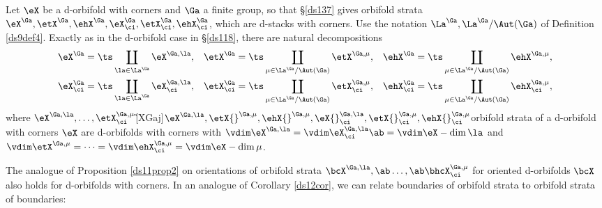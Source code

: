 \documentclass{article}
\begin{document}
Let $\eX$ be a d-orbifold with corners and $\Ga$ a finite group, so
that \S\ref{ds137} gives orbifold strata
$\eX^\Ga,\etX^\Ga,\ehX^\Ga,\eX^\Ga_\ci,\etX^\Ga_\ci,\ehX^\Ga_\ci$,
which are d-stacks with corners. Use the notation
$\La^\Ga,\La^\Ga/\Aut(\Ga)$ of Definition \ref{ds9def4}. Exactly as
in the d-orbifold case in \S\ref{ds118}, there are natural
decompositions
\begin{align*}
\eX^\Ga&=\ts\coprod_{\la\in\La^\Ga}\eX^{\Ga,\la}, &
\etX^\Ga&=\ts\coprod_{\mu\in\La^\Ga/\Aut(\Ga)}\etX^{\Ga,\mu},&
\ehX^\Ga&=\ts\coprod_{\mu\in\La^\Ga/\Aut(\Ga)}\ehX^{\Ga,\mu},\\
\eX^\Ga_\ci&=\ts\coprod_{\smash{\la\in\La^\Ga}}\eX^{\Ga,\la}_\ci, &
\etX^\Ga_\ci&=
\ts\coprod_{\mu\in\La^\Ga/\Aut(\Ga)} \etX^{\Ga,\mu}_\ci, &
\ehX^\Ga_\ci&=\ts\coprod_{\mu\in\La^\Ga/\Aut(\Ga)} \ehX^{\Ga,\mu}_\ci,
\end{align*}
where
$\eX^{\Ga,\la},\ldots,\etX^{\Ga,\mu}_\ci$\G[XGaj]{$\eX^{\Ga,\la},
\etX{}^{\Ga,\mu},\ehX{}^{\Ga,\mu},\eX{}^{\Ga,\la}_\ci,
\etX{}^{\Ga,\mu}_\ci,\ehX{}^{\Ga,\mu}_\ci$}{orbifold strata of a
d-orbifold with corners $\eX$} are d-orbifolds with corners with
$\vdim\eX^{\Ga,\la}=\vdim\eX^{\Ga,\la}_\ci\ab= \vdim\eX-\dim\la$ and
$\vdim\etX^{\Ga,\mu}=\cdots=\vdim\ehX^{\Ga,\mu}_\ci=\vdim\eX-
\dim\mu$.

The analogue of Proposition \ref{ds11prop2} on orientations of
orbifold strata $\bcX^{\Ga,\la},\ab\ldots,\ab\bhcX^{\Ga,\mu}_\ci$
for oriented d-orbifolds $\bcX$ also holds for d-orbifolds with
corners.
In an analogue of Corollary \ref{ds12cor}, we can relate boundaries
of orbifold strata to orbifold strata of boundaries:
\end{document}
